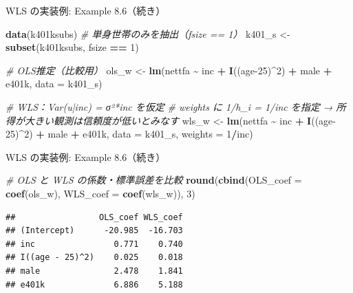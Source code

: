 \documentclass[
  ignorenonframetext,
]{beamer}
\newenvironment{Shaded}{\begin{snugshade}}{\end{snugshade}}
\newcommand{\AttributeTok}[1]{\textcolor[rgb]{0.13,0.29,0.53}{#1}}
\newcommand{\CommentTok}[1]{\textcolor[rgb]{0.56,0.35,0.01}{\textit{#1}}}
\newcommand{\DecValTok}[1]{\textcolor[rgb]{0.00,0.00,0.81}{#1}}
\newcommand{\FunctionTok}[1]{\textcolor[rgb]{0.13,0.29,0.53}{\textbf{#1}}}
\newcommand{\NormalTok}[1]{#1}
\newcommand{\OtherTok}[1]{\textcolor[rgb]{0.56,0.35,0.01}{#1}}
\newcommand{\SpecialCharTok}[1]{\textcolor[rgb]{0.81,0.36,0.00}{\textbf{#1}}}
\begin{document}
\begin{frame}[fragile]{WLS の実装例: Example 8.6（続き）}
\label{wls-ux306eux5b9fux88c5ux4f8b-example-8.6ux7d9aux304d}
\footnotesize

\begin{Shaded}
\begin{Highlighting}[]
\FunctionTok{data}\NormalTok{(k401ksubs)}
\CommentTok{\# 単身世帯のみを抽出（fsize == 1）}
\NormalTok{k401\_s }\OtherTok{\textless{}{-}} \FunctionTok{subset}\NormalTok{(k401ksubs, fsize }\SpecialCharTok{==} \DecValTok{1}\NormalTok{)}

\CommentTok{\# OLS推定（比較用）}
\NormalTok{ols\_w }\OtherTok{\textless{}{-}} \FunctionTok{lm}\NormalTok{(nettfa }\SpecialCharTok{\textasciitilde{}}\NormalTok{ inc }\SpecialCharTok{+} \FunctionTok{I}\NormalTok{((age}\DecValTok{{-}25}\NormalTok{)}\SpecialCharTok{\^{}}\DecValTok{2}\NormalTok{) }\SpecialCharTok{+}\NormalTok{ male }\SpecialCharTok{+}\NormalTok{ e401k, }\AttributeTok{data =}\NormalTok{ k401\_s)}

\CommentTok{\# WLS：Var(u|inc) = σ²*inc を仮定}
\CommentTok{\# weights に 1/h\_i = 1/inc を指定 → 所得が大きい観測は信頼度が低いとみなす}
\NormalTok{wls\_w }\OtherTok{\textless{}{-}} \FunctionTok{lm}\NormalTok{(nettfa }\SpecialCharTok{\textasciitilde{}}\NormalTok{ inc }\SpecialCharTok{+} \FunctionTok{I}\NormalTok{((age}\DecValTok{{-}25}\NormalTok{)}\SpecialCharTok{\^{}}\DecValTok{2}\NormalTok{) }\SpecialCharTok{+}\NormalTok{ male }\SpecialCharTok{+}\NormalTok{ e401k,}
            \AttributeTok{data =}\NormalTok{ k401\_s, }\AttributeTok{weights =} \DecValTok{1}\SpecialCharTok{/}\NormalTok{inc)}
\end{Highlighting}
\end{Shaded}
\end{frame}

\begin{frame}[fragile]{WLS の実装例: Example 8.6（続き）}
\label{wls-ux306eux5b9fux88c5ux4f8b-example-8.6ux7d9aux304d-1}
\footnotesize

\begin{Shaded}
\begin{Highlighting}[]
\CommentTok{\# OLS と WLS の係数・標準誤差を比較}
\FunctionTok{round}\NormalTok{(}\FunctionTok{cbind}\NormalTok{(}\AttributeTok{OLS\_coef  =} \FunctionTok{coef}\NormalTok{(ols\_w),}
            \AttributeTok{WLS\_coef  =} \FunctionTok{coef}\NormalTok{(wls\_w)), }\DecValTok{3}\NormalTok{)}
\end{Highlighting}
\end{Shaded}

\begin{verbatim}
##                 OLS_coef WLS_coef
## (Intercept)      -20.985  -16.703
## inc                0.771    0.740
## I((age - 25)^2)    0.025    0.018
## male               2.478    1.841
## e401k              6.886    5.188
\end{verbatim}

\normalsize
\end{frame}
\end{document}
